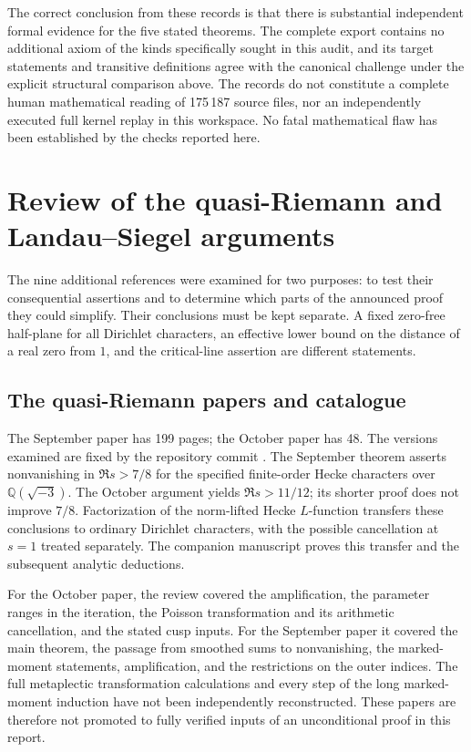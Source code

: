 \documentclass[11pt,a4paper]{article}
\theoremstyle{remark}
\newcommand{\Q}{\mathbb Q}
\newcommand{\src}[1]{\cite{#1}}
\begin{document}
The correct conclusion from these records is that there is substantial
independent formal evidence for the five stated theorems.  The complete export
contains no additional axiom of the kinds specifically sought in this audit,
and its target statements and transitive definitions agree with the canonical
challenge under the explicit structural comparison above.  The records do not constitute a complete human mathematical reading of
175\,187 source files, nor an independently executed full kernel replay in this
workspace.  No fatal mathematical flaw has been established by the checks
reported here.


\section{Review of the quasi-Riemann and Landau--Siegel arguments}
\label{sec:related-literature}

The nine additional references were examined for two purposes: to test
their consequential assertions and to determine which parts of the
announced proof they could simplify. Their conclusions must be kept
separate. A fixed zero-free half-plane for all Dirichlet characters,
an effective lower bound on the distance of a real zero from $1$, and
the critical-line assertion are different statements.

\subsection{The quasi-Riemann papers and catalogue}

The September paper has 199 pages; the October paper has 48. The
versions examined are fixed by the repository commit
.
The September theorem asserts nonvanishing in $\Re s>7/8$ for
the specified finite-order Hecke characters over
$\Q(\sqrt{-3})$. The October argument yields $\Re s>11/12$;
its shorter proof does not improve $7/8$. Factorization of the
norm-lifted Hecke $L$-function transfers these conclusions to ordinary
Dirichlet characters, with the possible cancellation at $s=1$
treated separately. The companion manuscript proves this transfer
and the subsequent analytic deductions.\src{qrh-september,qrh-october}

For the October paper, the review covered the amplification, the
parameter ranges in the iteration, the Poisson transformation and
its arithmetic cancellation, and the stated cusp inputs. For the
September paper it covered the main theorem, the passage from
smoothed sums to nonvanishing, the marked-moment statements,
amplification, and the restrictions on the outer indices.
The full metaplectic transformation calculations and every step of
the long marked-moment induction have not been independently
reconstructed. These papers are therefore not promoted to fully
verified inputs of an unconditional proof in this report.
\end{document}
